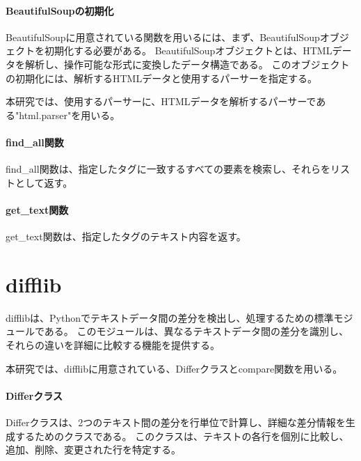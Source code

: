 \paragraph{BeautifulSoupの初期化}
BeautifulSoupに用意されている関数を用いるには、まず、BeautifulSoupオブジェクトを初期化する必要がある。
BeautifulSoupオブジェクトとは、HTMLデータを解析し、操作可能な形式に変換したデータ構造である。
このオブジェクトの初期化には、解析するHTMLデータと使用するパーサーを指定する。
\par
本研究では、使用するパーサーに、HTMLデータを解析するパーサーである"html.parser"を用いる。
\paragraph{find\_all関数}
find\_all関数は、指定したタグに一致するすべての要素を検索し、それらをリストとして返す。
\paragraph{get\_text関数}
get\_text関数は、指定したタグのテキスト内容を返す。

\section{difflib}\label{sec:difflib}
difflib\cite{difflib}は、Pythonでテキストデータ間の差分を検出し、処理するための標準モジュールである。
このモジュールは、異なるテキストデータ間の差分を識別し、それらの違いを詳細に比較する機能を提供する。
\par
本研究では、difflibに用意されている、Differクラスとcompare関数を用いる。
\paragraph{Differクラス}
Differクラスは、2つのテキスト間の差分を行単位で計算し、詳細な差分情報を生成するためのクラスである。
このクラスは、テキストの各行を個別に比較し、追加、削除、変更された行を特定する。
